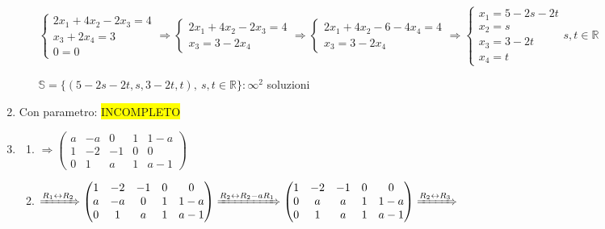 \documentclass{article}
\newcommand{\hl}[1]{\colorbox{yellow}{#1}}
\newcommand{\R}{\mathbb{R}}
\begin{document}
\begin{enumerate}
\begin{enumerate}
			            $\begin{cases}
					            2x_1+4x_2-2x_3=4 \\
					            x_3+2x_4=3       \\
					            0=0
				            \end{cases}\Rightarrow
				            \begin{cases}
					            2x_1+4x_2-2x_3=4 \\
					            x_3=3-2x_4
				            \end{cases}\Rightarrow
				            \begin{cases}
					            2x_1+4x_2-6-4x_4=4 \\
					            x_3=3-2x_4
				            \end{cases}\Rightarrow
				            \begin{cases}
					            x_1=5-2s-2t \\
					            x_2=s       \\
					            x_3=3-2t    \\
					            x_4=t
				            \end{cases}s,t\in\R$

			            $\mathbb{S}=\{(5-2s-2t,s,3-2t,t),\ s,t\in\R\}:\infty^2$ soluzioni
		      \end{enumerate}
		\item Con parametro: \hl{INCOMPLETO}
		\item \begin{enumerate}
			      \item $\Rightarrow\begin{pmatrix}
					            a & -a & 0  & 1 & 1-a \\
					            1 & -2 & -1 & 0 & 0   \\
					            0 & 1  & a  & 1 & a-1
				            \end{pmatrix}$
			      \item $\xRightarrow{R_1\leftrightarrow R_2}
				            \begin{pmatrix}
					            1 & -2 & -1 & 0 & 0   \\
					            a & -a & 0  & 1 & 1-a \\
					            0 & 1  & a  & 1 & a-1
				            \end{pmatrix}\xRightarrow{R_2\leftrightarrow R_2-aR_1}
				            \begin{pmatrix}
					            1 & -2 & -1 & 0 & 0   \\
					            0 & a  & a  & 1 & 1-a \\
					            0 & 1  & a  & 1 & a-1
				            \end{pmatrix}\xRightarrow{R_2\leftrightarrow R_3}$


\end{enumerate}
\end{enumerate}
\end{document}
